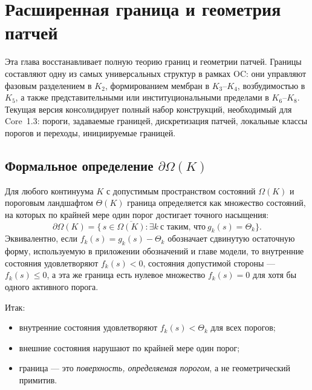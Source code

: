 
\section{Расширенная граница и геометрия патчей}
\label{sec:boundary-extended}

Эта глава восстанавливает полную теорию границ и геометрии патчей.
Границы составляют одну из самых универсальных структур в рамках OC:
они управляют фазовым разделением в \(K_2\), формированием мембран в \(K_3\)--\(K_4\),
возбудимостью в \(K_5\), а также представительными или институциональными пределами в
\(K_6\)--\(K_8\).  
Текущая версия консолидирует полный набор конструкций, необходимый для Core~1.3:
пороги, задаваемые границей, дискретизация патчей, локальные классы порогов
и переходы, инициируемые границей.

\subsection{Формальное определение \texorpdfstring{$\partial\Omega(K)$}{границы}}

Для любого континуума \(K\) с допустимым пространством состояний \(\Omega(K)\) и
пороговым ландшафтом \(\Theta(K)\) граница определяется как множество состояний, на которых
по крайней мере один порог достигает точного насыщения:
\[
  \partial\Omega(K)
  =
  \big\{\, s \in \overline{\Omega(K)} :
          \exists k\ \text{с таким, что}\ g_k(s) = \Theta_k \big\}.
\]
Эквивалентно, если \(f_k(s)=g_k(s)-\Theta_k\) обозначает сдвинутую остаточную форму,
используемую в приложении обозначений и главе модели, то внутренние состояния
удовлетворяют \(f_k(s)<0\), состояния допустимой стороны — \(f_k(s)\le0\),
а эта же граница есть нулевое множество \(f_k(s)=0\) для хотя бы одного
активного порога.

Итак:
\begin{itemize}
    \item внутренние состояния удовлетворяют \(f_k(s) < \Theta_k\) для всех порогов;
    \item внешние состояния нарушают по крайней мере один порог;
    \item граница — это \emph{поверхность, определяемая порогом}, а не геометрический
          примитив.
\end{itemize}

